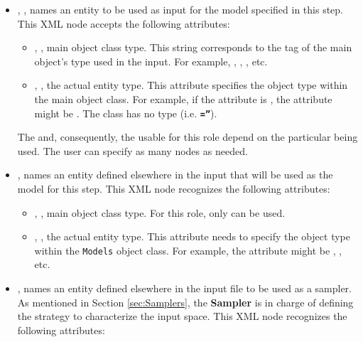 \begin{itemize}
\item {}, , names an entity to
be used as input for the model specified in this step.
This XML node accepts the following attributes:
\begin{itemize}
  \item {}, , main object class
    type.
    This string corresponds to the tag of the main object's type used in the
    input.
    For example, , , ,
    etc.
  \item {}, , the actual entity
    type.
    This attribute specifies the object type within the main object class.
    For example, if the   attribute is , the 
     attribute might be .
    \nb The class  has no type (i.e.
    \textbf{\texttt{=''}}).
\end{itemize}
\nb The  and, consequently, the  usable for this
role depend on the particular  being used.
The user can specify as many  nodes as needed.
\item {},  names an entity 
defined elsewhere in the input that will be used as the model for this step.
This XML node recognizes the following attributes:
\begin{itemize}
  \item {}, , main object class
    type.
    For this role, only  can be used.
  \item {}, , the actual entity
    type.
    This attribute needs to specify the object type within the \texttt{Models}
    object class.
    For example, the  attribute might be , 
    , etc.
\end{itemize}
\item {},  names an entity
defined elsewhere in the input file to be used as a sampler.
As mentioned in Section \ref{sec:Samplers}, the \textbf{Sampler} is in charge of
defining the strategy to characterize the input space.
This XML node recognizes the following attributes:
\begin{itemize}

\end{itemize}
\end{itemize}
